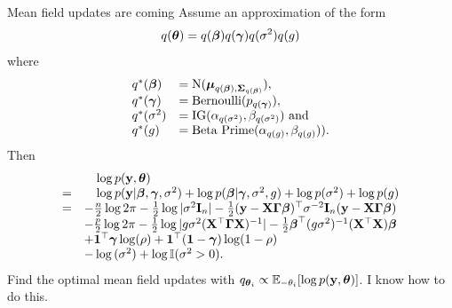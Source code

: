 \documentclass{beamer}
\begin{document}
\begin{frame}{Mean field updates are coming}
Assume an approximation of the form
\begin{equation*}
q({\boldsymbol \theta}) = q({\boldsymbol \beta}) q({\boldsymbol \gamma}) q(\sigma^2) q(g)
\end{equation*}
where
\begin{equation*}
\begin{array}{ll}
q^*({\boldsymbol \beta}) &= \text{N}({\boldsymbol \mu}_{q({\boldsymbol \beta}), {\boldsymbol \Sigma}_{q({\boldsymbol \beta})}}), \\
q^*({\boldsymbol \gamma}) &= \text{Bernoulli}(p_{q({\boldsymbol \gamma})}), \\
q^*(\sigma^2) &= \text{IG}(\alpha_{q(\sigma^2)}, \beta_{q(\sigma^2)}) \text{ and } \\
q^*(g) &= \text{Beta Prime}(\alpha_{q(g)}, \beta_{q(g)})). \\
\end{array}
\end{equation*}
Then
\begin{equation*}
\begin{array}{rl}
&\quad \log{p({\bf y}, {\boldsymbol\theta})} \\
=& \quad \log{p({\bf y}| {\boldsymbol\beta}, {\boldsymbol\gamma}, \sigma^2)} + \log{p({\boldsymbol\beta}| {\boldsymbol\gamma}, \sigma^2, g)} + \log{p(\sigma^2)} + \log{p(g)} \\
=& -\frac{n}{2} \log{2 \pi} -\tfrac{1}{2} \log |\sigma^2 {\bf I}_n| - \tfrac{1}{2} ({\bf y} - {\bf X} {\boldsymbol{\Gamma}} {\boldsymbol \beta})^\top \sigma^{-2} {\bf I}_n ({\bf y} - {\bf X} {\boldsymbol{\Gamma}} {\boldsymbol \beta}) \\
& -\frac{p}{2} \log{2 \pi} - \tfrac{1}{2} \log |g \sigma^2 ({\bf X}^\top {\boldsymbol{\Gamma}} {\bf X})^{-1}| -
	\tfrac{1}{2} {\boldsymbol \beta}^\top (g \sigma^2)^{-1} ({\bf X}^\top {\bf X}) {\boldsymbol \beta} \\
& + {\bf 1}^\top {\boldsymbol\gamma} \log(\rho) + {\bf 1}^\top ({\bf 1} - {\boldsymbol \gamma}) \log(1 - \rho)\\
& - \log{(\sigma^2)} + \log {\mathbb I} (\sigma^2 > 0). \\

\end{array}
\end{equation*}
Find the optimal mean field updates with $q_{{\boldsymbol \theta}_i} \propto {\mathbb E}_{-\theta_i} [\log p({\bf y}, {\boldsymbol \theta})]$. I
know how to do this.

\end{frame}
\end{document}
